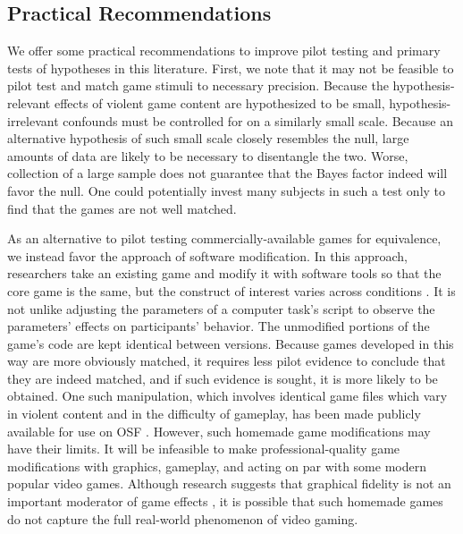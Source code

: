 \documentclass[man]{apa6}
\begin{document}
\subsection{Practical Recommendations}
We offer some practical recommendations to improve pilot testing and primary tests of hypotheses in this literature. First, we note that it may not be feasible to pilot test and match game stimuli to necessary precision. Because the hypothesis-relevant effects of violent game content are hypothesized to be small, hypothesis-irrelevant confounds must be controlled for on a similarly small scale. Because an alternative hypothesis of such small scale closely resembles the null, large amounts of data are likely to be necessary to disentangle the two. Worse, collection of a large sample does not guarantee that the Bayes factor indeed will favor the null. One could potentially invest many subjects in such a test only to find that the games are not well matched. 

As an alternative to pilot testing commercially-available games for equivalence, we instead favor the approach of software modification. In this approach, researchers take an existing game and modify it with software tools so that the core game is the same, but the construct of interest varies across conditions \citep[see][]{Elson:Quandt:2014}. It is not unlike adjusting the parameters of a computer task's script to observe the parameters' effects on participants' behavior. The unmodified portions of the game's code are kept identical between versions. Because games developed in this way are more obviously matched, it requires less pilot evidence to conclude that they are indeed matched, and if such evidence is sought, it is more likely to be obtained. One such manipulation, which involves identical game files which vary in violent content and in the difficulty of gameplay, has been made publicly available for use on OSF \citep{Hilgard:2014}. However, such homemade game modifications may have their limits. It will be infeasible to make professional-quality game modifications with graphics, gameplay, and acting on par with some modern popular video games. Although research suggests that graphical fidelity is not an important moderator of game effects \citep{Barlett:etal:2008,Ivory:Kalyanaraman:2007}, it is possible that such homemade games do not capture the full real-world phenomenon of video gaming.
\end{document}
